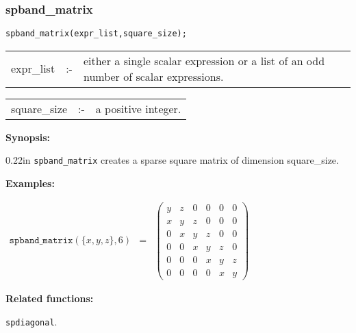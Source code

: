 \subsubsection{spband\_matrix}

\hspace*{0.175in} \texttt{spband\_matrix(expr\_list,square\_size);}

\hspace*{0.1in}
\begin{tabular}{l l l}
expr\_list  \hspace*{0.088in} &:-& \parbox[t]{.72\linewidth}
{either a single scalar expression or a list of an odd number of scalar
expressions.} 
\end{tabular}

\vspace*{0.04in}
\hspace*{0.1in}
\begin{tabular}{l l l}
square\_size &:-& a positive integer.
\end{tabular}

\textbf{Synopsis:}

\begin{addtolength}{\leftskip}{0.22in}
                \texttt{spband\_matrix} creates a sparse square matrix of 
                dimension square\_size. 

\end{addtolength}

\textbf{Examples:}

\begin{flushleft}  
\hspace*{0.1in}
\begin{math}  
\begin{array}{ccc}
\texttt{spband\_matrix}(\{x,y,z\},6) & = & 
\left( \begin{array}{cccccc} y & z & 0 & 0 & 0 & 0 \\ x & y & z & 0 & 0
& 0 \\ 0 & x & y & z & 0 & 0 \\ 0 & 0 & x & y & z & 0 \\ 0 & 0 & 0 & x &
 y & z \\ 0 & 0 & 0 & 0 & x & y 
\end{array} \right)
\end{array}  
\end{math}  
\end{flushleft}

\textbf{Related functions:} 

\hspace*{0.175in} \texttt{spdiagonal}.



